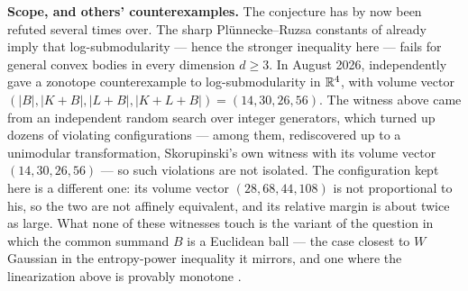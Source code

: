 \begin{cxrefutation}
\vskip4pt
\noindent\textbf{Scope, and others' counterexamples.} The conjecture has by now been refuted several times over.  The sharp
Pl\"unnecke--Ruzsa constants of \citet{FradeliziMadimanZvavitch2024} already
imply that log-submodularity --- hence the stronger inequality here --- fails
for general convex bodies in every dimension $d\ge3$.  In August 2026,
\citet{Skorupinski2026} independently gave a zonotope counterexample to
log-submodularity in $\mathbb R^4$, with volume vector
$(|B|,|K{+}B|,|L{+}B|,|K{+}L{+}B|)=(14,30,26,56)$.  The witness above came
from an independent random search over integer generators, which turned up
dozens of violating configurations --- among them, rediscovered up to a
unimodular transformation, Skorupinski's own witness with its volume vector
$(14,30,26,56)$ --- so such violations are not isolated.  The configuration
kept here is a different one: its volume vector $(28,68,44,108)$ is not
proportional to his, so the two are not affinely equivalent, and its relative
margin is about twice as large.  What none of these witnesses
touch is the variant of the question in which the common summand $B$ is a
Euclidean ball --- the case closest to $W$ Gaussian in the entropy-power
inequality it mirrors, and one where the linearization above is provably
monotone \citep{DemboCoverThomas1991}.
\end{cxrefutation}



